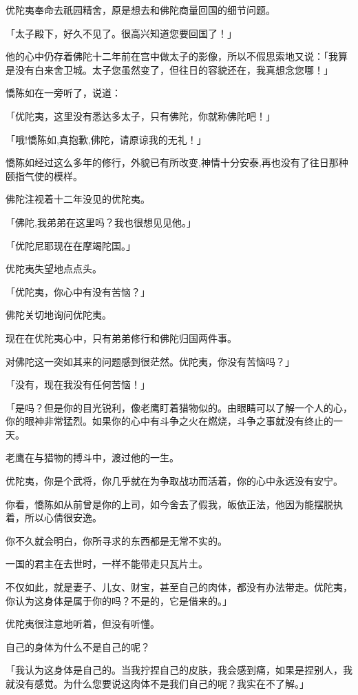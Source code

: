 \documentclass[twoside,openany]{book}
\begin{document}
优陀夷奉命去祇园精舍，原是想去和佛陀商量回国的细节问题。

「太子殿下，好久不见了。很高兴知道您要回国了！」

他的心中仍存着佛陀十二年前在宫中做太子的影像，所以不假思索地又说：「我算是没有白来舍卫城。太子您虽然变了，但往日的容貌还在，我真想念您哪！」

憍陈如在一旁听了，说道：

「优陀夷，这里没有悉达多太子，只有佛陀，你就称佛陀吧！」

「哦!憍陈如,真抱歉,佛陀，请原谅我的无礼！」

憍陈如经过这么多年的修行，外貌已有所改变,神情十分安泰,再也没有了往日那种颐指气使的模样。

佛陀注视着十二年没见的优陀夷。

「佛陀,我弟弟在这里吗？我也很想见见他。」

「优陀尼耶现在在摩竭陀国。」

优陀夷失望地点点头。

「优陀夷，你心中有没有苦恼？」

佛陀关切地询问优陀夷。

现在在优陀夷心中，只有弟弟修行和佛陀归国两件事。

对佛陀这一突如其来的问题感到很茫然。优陀夷，你没有苦恼吗？」

「没有，现在我没有任何苦恼！」

「是吗？但是你的目光锐利，像老鹰盯着猎物似的。由眼睛可以了解一个人的心，你的眼神非常猛烈。如果你的心中有斗争之火在燃烧，斗争之事就没有终止的一天。

老鹰在与猎物的搏斗中，渡过他的一生。

优陀夷，你是个武将，你几乎就在为争取战功而活着，你的心中永远没有安宁。

你看，憍陈如从前曾是你的上司，如今舍去了假我，皈依正法，他因为能摆脱执着，所以心倩很安逸。

你不久就会明白，你所寻求的东西都是无常不实的。

一国的君主在去世时，一样不能带走只瓦片土。

不仅如此，就是妻子、儿女、财宝，甚至自己的肉体，都没有办法带走。优陀夷，你认为这身体是属于你的吗？不是的，它是借来的。」

优陀夷很注意地听着，但没有听懂。

自己的身体为什么不是自己的呢？

「我认为这身体是自己的。当我拧捏自己的皮肤，我会感到痛，如果是捏别人，我就没有感觉。为什么您要说这肉体不是我们自己的呢？我实在不了解。」
\end{document}

